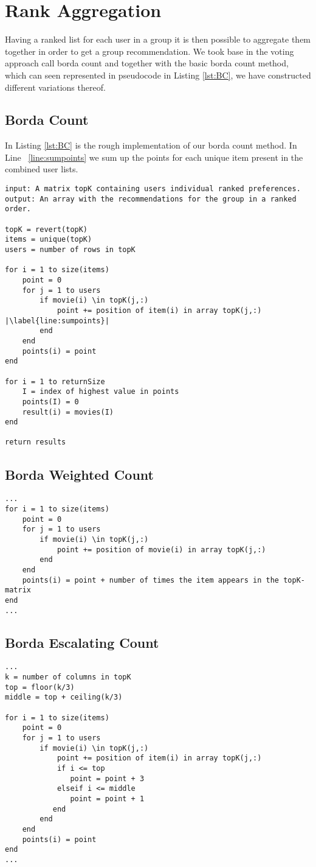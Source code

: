 \section{Rank Aggregation}\label{sec:rank_aggregation}
Having a ranked list for each user in a group it is then possible to aggregate them together in order to get a group recommendation. We took base in the voting approach call borda count and together with the basic borda count method, which can seen represented in pseudocode in Listing \ref{lst:BC}, we have constructed different variations thereof. 
\subsection{Borda Count}
In Listing \ref{lst:BC} is the rough implementation of our borda count method. In Line ~\ref{line:sumpoints} we sum up the points for each unique item present in the combined user lists.
\begin{lstlisting}[caption={Borda count implementation},label=lst:BC,escapechar=|]
input: A matrix topK containing users individual ranked preferences.
output: An array with the recommendations for the group in a ranked order.

topK = revert(topK)
items = unique(topK)
users = number of rows in topK

for i = 1 to size(items)
	point = 0
	for j = 1 to users
		if movie(i) \in topK(j,:)
			point += position of item(i) in array topK(j,:) |\label{line:sumpoints}|
		end
	end
	points(i) = point
end

for i = 1 to returnSize
	I = index of highest value in points
	points(I) = 0
	result(i) = movies(I)
end

return results

\end{lstlisting}

\subsection{Borda Weighted Count}
\begin{lstlisting}[caption={Borda weighted count implementation},label=lst:BWC, firstnumber=7]
...
for i = 1 to size(items)
	point = 0
	for j = 1 to users
		if movie(i) \in topK(j,:)
			point += position of movie(i) in array topK(j,:)
		end
	end
	points(i) = point + number of times the item appears in the topK-matrix
end
...
\end{lstlisting}
\subsection{Borda Escalating Count}
\begin{lstlisting}[caption={Borda escalating count implementation},label=lst:BEC, firstnumber=7]
...
k = number of columns in topK
top = floor(k/3)
middle = top + ceiling(k/3)

for i = 1 to size(items)
	point = 0
	for j = 1 to users
		if movie(i) \in topK(j,:)
			point += position of item(i) in array topK(j,:)
			if i <= top
               point = point + 3
           	elseif i <= middle
               point = point + 1
           end 
		end
	end
	points(i) = point
end
...
\end{lstlisting}

